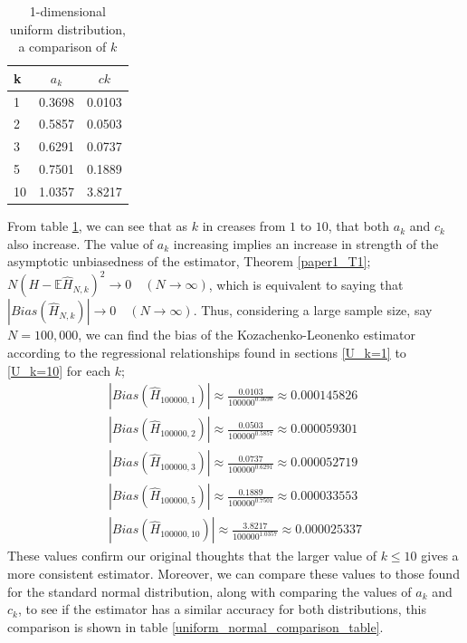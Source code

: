 \documentclass{article}
\begin{document}
\begin{table}
\caption{1-dimensional uniform distribution, a comparison of $k$} \label{uniform_k_comparison_table}
\begin{center}
\begin{tabular}{| l | c c|} 
\toprule
k & $a_{k}$ & $c{k}$ \\
\midrule[1pt]
1 & 0.3698 & 0.0103 \\
2 & 0.5857 & 0.0503 \\
3 & 0.6291 & 0.0737 \\
5 & 0.7501 & 0.1889 \\
10 & 1.0357 &  3.8217 \\
\hline
\end{tabular}
\end{center}
\end{table}

From table \ref{uniform_k_comparison_table}, we can see that as $k$ in creases from $1$ to $10$, that both $a_{k}$ and $c_{k}$ also increase. The value of $a_{k}$ increasing implies an increase in strength of the asymptotic unbiasedness of the estimator, Theorem \ref{paper1_T1};  $N (H - \mathbb{E}{\hat{H}_{N, k}})^2 \to 0 \quad  (N \to \infty)$, which is equivalent to saying that $|Bias(\hat{H}_{N, k})| \to 0 \quad (N \to \infty)$. Thus, considering a large sample size, say $N=100,000$, we can find the bias of the Kozachenko-Leonenko estimator according to the regressional relationships found in sections \ref{U_k=1} to \ref{U_k=10} for each $k$;
\begin{gather*}
|Bias(\hat{H}_{100000, 1})| \approx  \frac{0.0103}{100000^{0.3698}}   \approx 0.000145826 \\
|Bias(\hat{H}_{100000, 2})| \approx  \frac{0.0503}{100000^{0.5857}}   \approx 0.000059301 \\
|Bias(\hat{H}_{100000, 3})| \approx  \frac{0.0737}{100000^{0.6291}}   \approx 0.000052719 \\
|Bias(\hat{H}_{100000, 5})| \approx  \frac{0.1889}{100000^{0.7501}}   \approx 0.000033553\\
|Bias(\hat{H}_{100000, 10})| \approx  \frac{3.8217}{100000^{1.0357}}  \approx 0.000025337
\end{gather*}
These values confirm our original thoughts that the larger value of $k \leq 10$ gives a more consistent estimator. Moreover, we can compare these values to those found for the standard normal distribution, along with comparing the values of $a_{k}$ and $c_{k}$, to see if the estimator has a similar accuracy for both distributions, this comparison is shown in table \ref{uniform_normal_comparison_table}.
\end{document}
